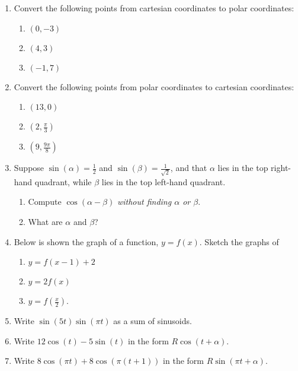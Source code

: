 \documentclass{article}
\begin{document}
\begin{enumerate}
\item Convert the following points from cartesian coordinates to polar coordinates:
	\begin{enumerate}
	\item $(0,-3)$
	\item $(4,3)$
	\item $(-1,7)$
	\end{enumerate}
\item Convert the following points from polar coordinates to cartesian coordinates:
	\begin{enumerate}
	\item $(13,0)$
	\item $\left(2,\frac{\pi}{3}\right)$
	\item $\left(9,\frac{9\pi}{8}\right)$
	\end{enumerate}
\item Suppose $\sin(\alpha)=\frac{1}{2}$ and $\sin(\beta)=\frac{1}{\sqrt{2}}$, and that $\alpha$ lies in the top right-hand quadrant, while $\beta$ lies in the top left-hand quadrant.
	\begin{enumerate}
	\item Compute $\cos(\alpha-\beta)$ \textit{without finding $\alpha$ or $\beta$}.
	\item What are $\alpha$ and $\beta$?
	\end{enumerate}
\item Below is shown the graph of a function, $y=f(x)$. Sketch the graphs of
	\begin{enumerate}
	\item $y=f(x-1)+2$
	\item $y=2f(x)$
	\item $y=f\left(\frac{x}{2}\right)$.
	\end{enumerate}
\item Write $\sin(5t)\sin(\pi t)$ as a sum of sinusoids.
\item Write $12\cos(t)-5\sin(t)$ in the form $R\cos(t+\alpha)$.
\item Write $8\cos(\pi t) + 8\cos(\pi(t+1))$ in the form $R\sin(\pi t+\alpha)$.	
\end{enumerate}

\begin{center}
\end{center}
\end{document}
